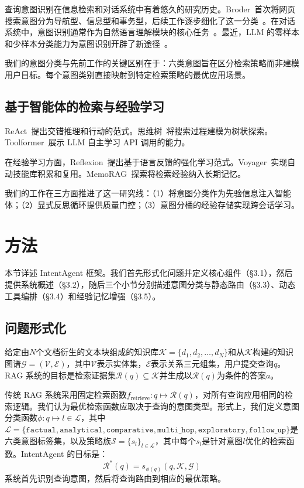 \documentclass[runningheads]{llncs}
\begin{document}
查询意图识别在信息检索和对话系统中有着悠久的研究历史。Broder~\cite{ref8}首次将网页搜索意图分为导航型、信息型和事务型，后续工作逐步细化了这一分类~\cite{ref9,ref10}。在对话系统中，意图识别通常作为自然语言理解模块的核心任务~\cite{ref11}。最近，LLM 的零样本和少样本分类能力为意图识别开辟了新途径~\cite{ref12}。

我们的意图分类与先前工作的关键区别在于：六类意图旨在区分检索策略而非建模用户目标。每个意图类别直接映射到特定检索策略的最优应用场景。

\subsection{基于智能体的检索与经验学习}

ReAct~\cite{ref13}提出交错推理和行动的范式。思维树~\cite{ref14}将搜索过程建模为树状探索。Toolformer~\cite{ref15}展示 LLM 自主学习 API 调用的能力。

在经验学习方面，Reflexion~\cite{ref16}提出基于语言反馈的强化学习范式。Voyager~\cite{ref17}实现自动技能库积累和复用。MemoRAG~\cite{ref18}探索将检索经验纳入长期记忆。

我们的工作在三方面推进了这一研究线：（1）将意图分类作为先验信息注入智能体；（2）显式反思循环提供质量门控；（3）意图分桶的经验存储实现跨会话学习。

\section{方法}

本节详述 IntentAgent 框架。我们首先形式化问题并定义核心组件（§3.1），然后提供系统概述（§3.2），随后三个小节分别描述意图分类与静态路由（§3.3）、动态工具编排（§3.4）和经验记忆增强（§3.5）。

\subsection{问题形式化}

给定由$N$个文档衍生的文本块组成的知识库$\mathcal{K} = \{d_1, d_2, \ldots, d_N\}$和从$\mathcal{K}$构建的知识图谱$\mathcal{G} = (\mathcal{V}, \mathcal{E})$，其中$\mathcal{V}$表示实体集，$\mathcal{E}$表示关系三元组集，用户提交查询$q$。RAG 系统的目标是检索证据集$\mathcal{R}(q) \subseteq \mathcal{K}$并生成以$\mathcal{R}(q)$为条件的答案$a$。

传统 RAG 系统采用固定检索函数$f_{\text{retrieve}}: q \mapsto \mathcal{R}(q)$，对所有查询应用相同的检索逻辑。我们认为最优检索函数应取决于查询的意图类型。形式上，我们定义意图分类函数$\phi: q \mapsto l \in \mathcal{L}$，其中$\mathcal{L} = \{\texttt{factual}, \texttt{analytical}, \texttt{comparative}, \texttt{multi\_hop}, \texttt{exploratory}, \texttt{follow\_up}\}$是六类意图标签集，以及策略族$\mathcal{S} = \{s_l\}_{l \in \mathcal{L}}$，其中每个$s_l$是针对意图$l$优化的检索函数。IntentAgent 的目标是：
\begin{equation}
    \mathcal{R}^*(q) = s_{\phi(q)}(q, \mathcal{K}, \mathcal{G})
\end{equation}
系统首先识别查询意图，然后将查询路由到相应的最优策略。
\end{document}
